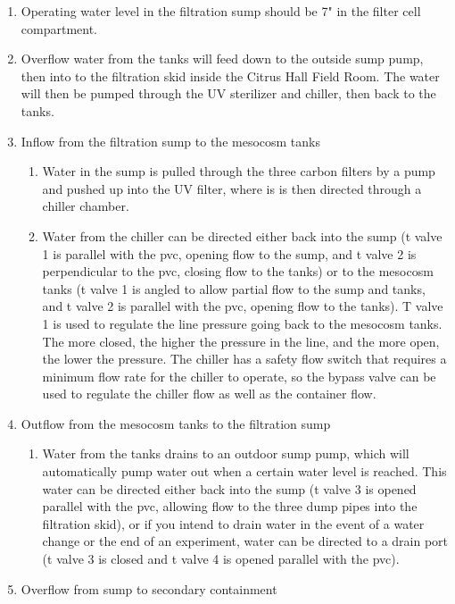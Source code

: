 \documentclass[]{book}
\providecommand{\tightlist}{%
  \setlength{\itemsep}{0pt}\setlength{\parskip}{0pt}}
\begin{document}
\begin{enumerate}
\def\labelenumi{\arabic{enumi}.}
\tightlist
\item
  Operating water level in the filtration sump should be 7" in the
  filter cell compartment.
\item
  Overflow water from the tanks will feed down to the outside sump pump,
  then into to the filtration skid inside the Citrus Hall Field Room.
  The water will then be pumped through the UV sterilizer and chiller,
  then back to the tanks.
\item
  Inflow from the filtration sump to the mesocosm tanks

  \begin{enumerate}
  \def\labelenumii{\arabic{enumii}.}
  \tightlist
  \item
    Water in the sump is pulled through the three carbon filters by a
    pump and pushed up into the UV filter, where is is then directed
    through a chiller chamber.
  \item
    Water from the chiller can be directed either back into the sump (t
    valve 1 is parallel with the pvc, opening flow to the sump, and t
    valve 2 is perpendicular to the pvc, closing flow to the tanks) or
    to the mesocosm tanks (t valve 1 is angled to allow partial flow to
    the sump and tanks, and t valve 2 is parallel with the pvc, opening
    flow to the tanks). T valve 1 is used to regulate the line pressure
    going back to the mesocosm tanks. The more closed, the higher the
    pressure in the line, and the more open, the lower the pressure. The
    chiller has a safety flow switch that requires a minimum flow rate
    for the chiller to operate, so the bypass valve can be used to
    regulate the chiller flow as well as the container flow.
  \end{enumerate}
\item
  Outflow from the mesocosm tanks to the filtration sump

  \begin{enumerate}
  \def\labelenumii{\arabic{enumii}.}
  \tightlist
  \item
    Water from the tanks drains to an outdoor sump pump, which will
    automatically pump water out when a certain water level is reached.
    This water can be directed either back into the sump (t valve 3 is
    opened parallel with the pvc, allowing flow to the three dump pipes
    into the filtration skid), or if you intend to drain water in the
    event of a water change or the end of an experiment, water can be
    directed to a drain port (t valve 3 is closed and t valve 4 is
    opened parallel with the pvc).
  \end{enumerate}
\item
  Overflow from sump to secondary containment


\end{enumerate}
\end{document}
